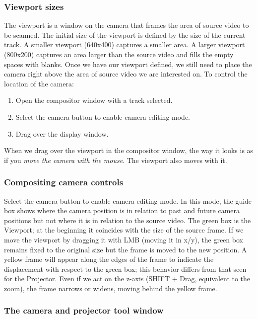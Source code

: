 \subsubsection*{Viewport sizes}%
\label{ssub:viewport_sizes}

The viewport is a window on the camera that frames the area of source video to be scanned.
The initial size of the viewport is defined by the size of the current track. A smaller viewport (640x400) captures a smaller area. 
A larger viewport (800x200) captures an area larger than the source video and fills the empty spaces with blanks. 
Once we have our viewport defined, we still need to place the camera right above the area of source video we are interested on. To control the location of the camera:

\begin{enumerate}
    \item  Open the compositor window with a track selected.
    \item  Select the camera button to enable camera editing mode.
    \item  Drag over the display window.
\end{enumerate}

When we drag over the viewport in the compositor window, the way it looks is as if you \textit{move the camera with the mouse}.  The viewport also moves with it.

\subsubsection*{Compositing camera controls}%
\label{ssub:compositing_camera_controls}

Select the camera button to enable camera editing mode. 
In this mode, the guide box shows where the camera position is in relation to past and future camera positions but not where it is in relation to the source video. 
The green box is the Viewport; at the beginning it coincides with the size of the source frame. If we move the viewport by dragging it with LMB (moving it in x/y), the green box remains fixed to the original size but the frame is moved to the new position.  A yellow frame will appear along the edges of the frame to indicate the displacement with respect to the green box; this behavior differs from that seen for the Projector. Even if we act on the z-axis (SHIFT + Drag, equivalent to the zoom), the frame narrows or widens, moving behind the yellow frame.

\subsubsection*{The camera and projector tool window}%
\label{ssub:the_camera_and_projector_tool_window}

